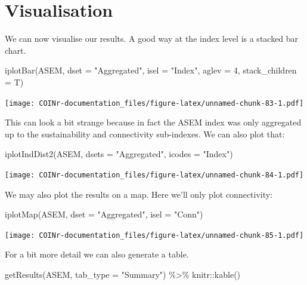 \documentclass[
]{book}
\newenvironment{Shaded}{\begin{snugshade}}{\end{snugshade}}
\newcommand{\AttributeTok}[1]{\textcolor[rgb]{0.77,0.63,0.00}{#1}}
\newcommand{\DecValTok}[1]{\textcolor[rgb]{0.00,0.00,0.81}{#1}}
\newcommand{\FunctionTok}[1]{\textcolor[rgb]{0.00,0.00,0.00}{#1}}
\newcommand{\NormalTok}[1]{#1}
\newcommand{\SpecialCharTok}[1]{\textcolor[rgb]{0.00,0.00,0.00}{#1}}
\newcommand{\StringTok}[1]{\textcolor[rgb]{0.31,0.60,0.02}{#1}}
\begin{document}
\hypertarget{visualisation-1}{%
\section{Visualisation}\label{visualisation-1}}

We can now visualise our results. A good way at the index level is a stacked bar chart.

\begin{Shaded}
\begin{Highlighting}[]
\FunctionTok{iplotBar}\NormalTok{(ASEM, }\AttributeTok{dset =} \StringTok{"Aggregated"}\NormalTok{, }\AttributeTok{isel =} \StringTok{"Index"}\NormalTok{, }\AttributeTok{aglev =} \DecValTok{4}\NormalTok{, }\AttributeTok{stack\_children =}\NormalTok{ T)}
\end{Highlighting}
\end{Shaded}

\texttt{[image: COINr-documentation\_files/figure-latex/unnamed-chunk-83-1.pdf]}

This can look a bit strange because in fact the ASEM index was only aggregated up to the sustainability and connectivity sub-indexes. We can also plot that:

\begin{Shaded}
\begin{Highlighting}[]
\FunctionTok{iplotIndDist2}\NormalTok{(ASEM, }\AttributeTok{dsets =} \StringTok{"Aggregated"}\NormalTok{, }\AttributeTok{icodes =} \StringTok{"Index"}\NormalTok{)}
\end{Highlighting}
\end{Shaded}

\texttt{[image: COINr-documentation\_files/figure-latex/unnamed-chunk-84-1.pdf]}

We may also plot the results on a map. Here we'll only plot connectivity:

\begin{Shaded}
\begin{Highlighting}[]
\FunctionTok{iplotMap}\NormalTok{(ASEM, }\AttributeTok{dset =} \StringTok{"Aggregated"}\NormalTok{, }\AttributeTok{isel =} \StringTok{"Conn"}\NormalTok{)}
\end{Highlighting}
\end{Shaded}

\texttt{[image: COINr-documentation\_files/figure-latex/unnamed-chunk-85-1.pdf]}

For a bit more detail we can also generate a table.

\begin{Shaded}
\begin{Highlighting}[]
\FunctionTok{getResults}\NormalTok{(ASEM, }\AttributeTok{tab\_type =} \StringTok{"Summary"}\NormalTok{) }\SpecialCharTok{\%\textgreater{}\%}
\NormalTok{  knitr}\SpecialCharTok{::}\FunctionTok{kable}\NormalTok{()}
\end{Highlighting}
\end{Shaded}
\end{document}
